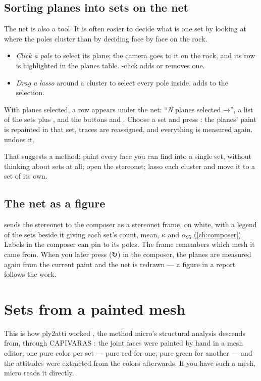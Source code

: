 \subsection{Sorting planes into sets on the net}

The net is also a tool. It is often easier to decide what is one set by looking at where the poles cluster than by deciding face by face on the rock.

\begin{itemize}
\item \emph{Click a pole} to select its plane; the camera goes to it on the rock, and its row is highlighted in the planes table. -click adds or removes one.
\item \emph{Drag a lasso} around a cluster to select every pole inside.  adds to the selection.
\end{itemize}

With planes selected, a row appears under the net: “\emph{N} planes selected →”, a list of the sets plus , and the buttons  and . Choose a set and press : the planes' paint is repainted in that set, traces are reassigned, and everything is measured again.  undoes it.

That suggests a method: paint every face you can find into a single set, without thinking about sets at all; open the stereonet; lasso each cluster and move it to a set of its own.

\subsection{The net as a figure}

 sends the stereonet to the composer as a stereonet frame, on white, with a legend of the sets beside it giving each set's count, mean, $\kappa$ and $\alpha_{95}$ (\cref{ch:composer}). Labels in the composer can pin to its poles. The frame remembers which mesh it came from. When you later press  (↻) in the composer, the planes are measured again from the current paint and the net is redrawn — a figure in a report follows the work.

\section{Sets from a painted mesh}\label{sec:structure-import}

This is how ply2atti worked \parencite{viana2016}, the method micro's structural analysis descends from, through CAPIVARAS \parencite{viana2021}: the joint faces were painted by hand in a mesh editor, one pure color per set — pure red for one, pure green for another — and the attitudes were extracted from the colors afterwards. If you have such a mesh, micro reads it directly.

